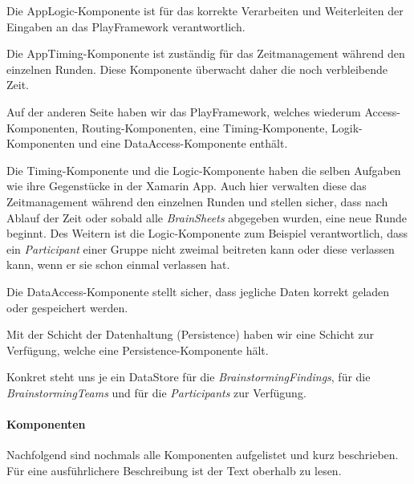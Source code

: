 Die AppLogic-Komponente ist für das korrekte Verarbeiten und Weiterleiten der Eingaben an das PlayFramework verantwortlich.

Die AppTiming-Komponente ist zuständig für das Zeitmanagement während den einzelnen Runden. Diese Komponente überwacht daher die noch verbleibende Zeit.

Auf der anderen Seite haben wir das PlayFramework, welches wiederum Access-Komponenten, Routing-Komponenten, eine Timing-Komponente, Logik-Komponenten und eine DataAccess-Komponente enthält.

Die Timing-Komponente und die Logic-Komponente haben die selben Aufgaben wie ihre Gegenstücke in der Xamarin App. Auch hier verwalten diese das Zeitmanagement während den einzelnen Runden und stellen sicher, dass nach Ablauf der Zeit oder sobald alle \textit{BrainSheets} abgegeben wurden, eine neue Runde beginnt. Des Weitern ist die Logic-Komponente zum Beispiel verantwortlich, dass ein \textit{Participant} einer Gruppe nicht zweimal beitreten kann oder diese verlassen kann, wenn er sie schon einmal verlassen hat. 

Die DataAccess-Komponente stellt sicher, dass jegliche Daten korrekt geladen oder gespeichert werden.

Mit der Schicht der Datenhaltung (Persistence) haben wir eine Schicht zur Verfügung, welche eine Persistence-Komponente hält. 

Konkret steht uns je ein DataStore für die \textit{BrainstormingFindings}, für die \textit{BrainstormingTeams} und für die \textit{Participants} zur Verfügung.

\paragraph*{Komponenten}
Nachfolgend sind nochmals alle Komponenten aufgelistet und kurz beschrieben. Für eine ausführlichere Beschreibung ist der Text oberhalb zu lesen.


